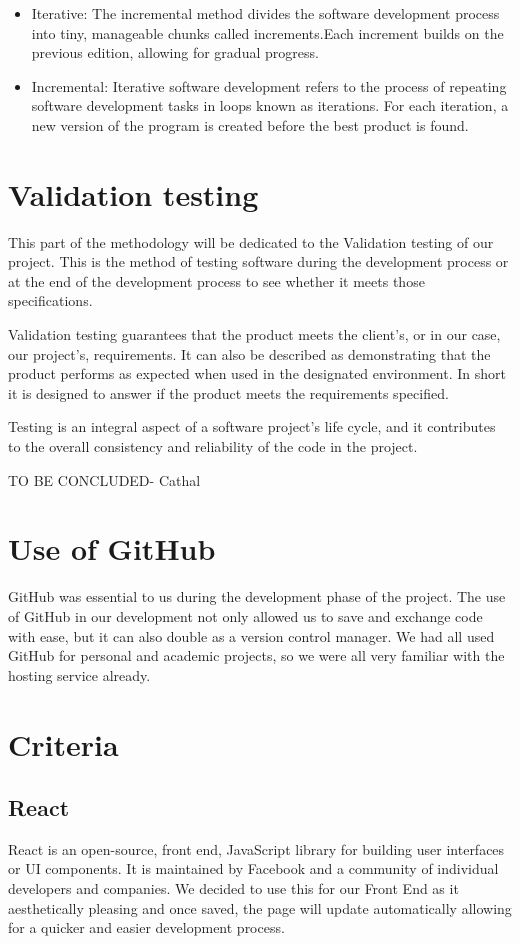 \begin{itemize}
    \item Iterative: The incremental method divides the software development process into tiny, manageable chunks called increments.Each increment builds on the previous edition, allowing for gradual progress. 
    \item Incremental: Iterative software development refers to the process of repeating software development tasks in loops known as iterations. For each iteration, a new version of the program is created before the best product is found. 
\end{itemize}

\section{Validation testing}
This part of the methodology will be dedicated to the Validation testing of our project. This is the method of testing software during the development process or at the end of the development process to see whether it meets those specifications. \par
Validation testing guarantees that the product meets the client's, or in our case, our project's, requirements. It can also be described as demonstrating that the product performs as expected when used in the designated environment. In short it is designed to answer if the product meets the requirements specified.\par
Testing is an integral aspect of a software project's life cycle, and it contributes to the overall consistency and reliability of the code in the project. 

TO BE CONCLUDED- Cathal

\section{Use of GitHub}
GitHub was essential to us during the development phase of the project. The use of GitHub in our development not only allowed us to save and exchange code with ease, but it can also double as a version control manager. We had all used GitHub for personal and academic projects, so we were all very familiar with the hosting service already. 
\section{Criteria}
\subsection{React}
React is an open-source, front end, JavaScript library for building user interfaces or UI components. It is maintained by Facebook and a community of individual developers and companies. We decided to use this for our Front End as it aesthetically pleasing and once saved, the page will update automatically allowing for a quicker and easier development process.

